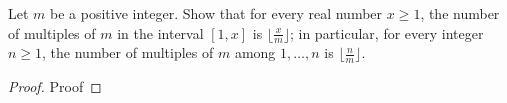 \begin{statement}{1.3}
  Let $m$ be a positive integer. Show that for every real number $x
  \ge 1$, the number of multiples of $m$ in the interval $[1,x]$ is
  $\lfloor \frac{x}{m} \rfloor$; in particular, for every integer $n
  \ge 1$, the number of multiples of $m$ among $1,\ldots,n$ is
  $\lfloor \frac{n}{m} \rfloor$.
\end{statement}
\begin{proof}
  Proof
\end{proof}
